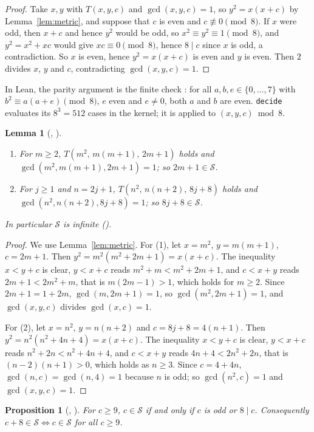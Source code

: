 \documentclass[11pt]{amsart}
\theoremstyle{plain}
\newtheorem{lemma}[theorem]{Lemma}
\newtheorem{proposition}[theorem]{Proposition}
\theoremstyle{definition}
\newcommand{\Side}{\mathcal{S}}
\begin{document}
\begin{proof}
Take $x,y$ with $T(x,y,c)$ and $\gcd(x,y,c)=1$, so $y^2=x(x+c)$ by Lemma~\ref{lem:metric}, and suppose that $c$ is even and $c\not\equiv0\pmod 8$. If $x$ were odd, then $x+c$ and hence $y^2$ would be odd, so $x^2\equiv y^2\equiv1\pmod8$, and $y^2=x^2+xc$ would give $xc\equiv0\pmod8$, hence $8\mid c$ since $x$ is odd, a contradiction. So $x$ is even, hence $y^2=x(x+c)$ is even and $y$ is even. Then $2$ divides $x$, $y$ and $c$, contradicting $\gcd(x,y,c)=1$.
\end{proof}

In Lean, the parity argument is the finite check : for all $a,b,e\in\{0,\dots,7\}$ with $b^2\equiv a(a+e)\pmod 8$, $e$ even and $e\ne0$, both $a$ and $b$ are even. \texttt{decide} evaluates its $8^3=512$ cases in the kernel; it is applied to $(x,y,c)\bmod 8$.

\begin{lemma}[, ]\label{lem:families}
\leavevmode
\begin{enumerate}
\item For $m\ge2$, $T(m^2,\,m(m+1),\,2m+1)$ holds and $\gcd(m^2,m(m+1),2m+1)=1$; so $2m+1\in\Side$.
\item For $j\ge1$ and $n=2j+1$, $T(n^2,\,n(n+2),\,8j+8)$ holds and $\gcd(n^2,n(n+2),8j+8)=1$; so $8j+8\in\Side$.
\end{enumerate}
In particular $\Side$ is infinite ().
\end{lemma}

\begin{proof}
We use Lemma~\ref{lem:metric}. For (1), let $x=m^2$, $y=m(m+1)$, $c=2m+1$. Then $y^2=m^2(m^2+2m+1)=x(x+c)$. The inequality $x<y+c$ is clear, $y<x+c$ reads $m^2+m<m^2+2m+1$, and $c<x+y$ reads $2m+1<2m^2+m$, that is $m(2m-1)>1$, which holds for $m\ge2$. Since $2m+1=1+2m$, $\gcd(m,2m+1)=1$, so $\gcd(m^2,2m+1)=1$, and $\gcd(x,y,c)$ divides $\gcd(x,c)=1$.

For (2), let $x=n^2$, $y=n(n+2)$ and $c=8j+8=4(n+1)$. Then $y^2=n^2(n^2+4n+4)=x(x+c)$. The inequality $x<y+c$ is clear, $y<x+c$ reads $n^2+2n<n^2+4n+4$, and $c<x+y$ reads $4n+4<2n^2+2n$, that is $(n-2)(n+1)>0$, which holds as $n\ge3$. Since $c=4+4n$, $\gcd(n,c)=\gcd(n,4)=1$ because $n$ is odd; so $\gcd(n^2,c)=1$ and $\gcd(x,y,c)=1$.
\end{proof}

\begin{proposition}[, ]\label{prop:large}
For $c\ge9$, $c\in\Side$ if and only if $c$ is odd or $8\mid c$. Consequently $c+8\in\Side\iff c\in\Side$ for all $c\ge9$.
\end{proposition}
\end{document}
